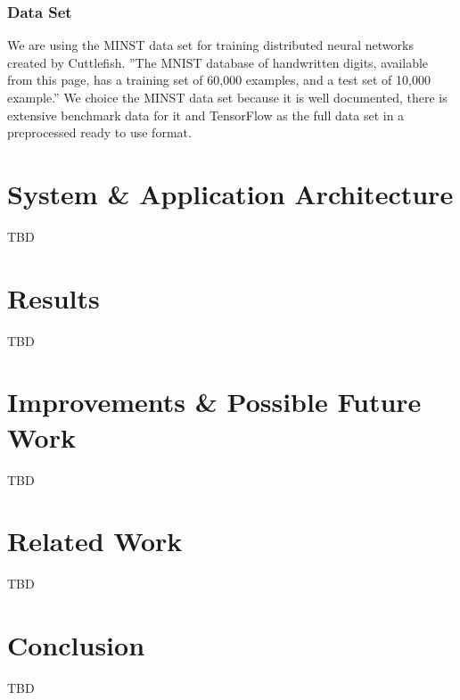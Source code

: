 \documentclass[conference]{IEEEtran}
\begin{document}
\subsubsection{Data Set}
We are using the MINST data set for training distributed neural networks created by Cuttlefish. ''The MNIST database of handwritten digits, available from this page, has a training set of 60,000 examples, and a test set of 10,000 example.'' \cite{mnist-doc} We choice the MINST data set because it is well documented, there is extensive benchmark data for it and TensorFlow as the full data set in a preprocessed ready to use format.


\section{System \& Application Architecture}
TBD

\section{Results}
TBD

\section{Improvements \& Possible Future Work}
TBD

\section{Related Work}
TBD


\section{Conclusion}
TBD




\end{document}
